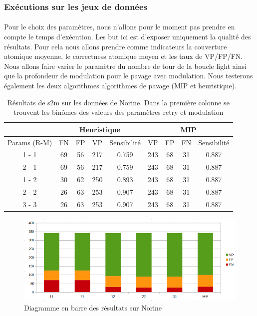 \documentclass[12pt,french,twoside]{report}
\begin{document}
\subsubsection{Exécutions sur les jeux de données}

\label{resultats_s2m_p}

\paragraph{}Pour le choix des paramètres, nous n'allons pour le moment pas prendre en compte le temps d'exécution.
Les but ici est d'exposer uniquement la qualité des résultats.
Pour cela nous allons prendre comme indicateurs la couverture atomique moyenne, le correctness atomique moyen et les taux de VP/FP/FN.
Nous allons faire varier le paramètre du nombre de tour de la boucle light ainsi que la profondeur de modulation pour le pavage avec modulation.
Nous testerons également les deux algorithmes algorithmes de pavage (MIP et heuristique).

\begin{table}[!h]
  \centering
  \begin{tabular}{|c|c|c|c|c|c|c|c|c|}
    \hline
    & \multicolumn{4}{c|}{Heuristique} & \multicolumn{4}{c|}{MIP} \\
    \hline
    Params (R-M) & FN & FP & VP & Sensibilité & VP & FP & FN & Sensibilité \\
    \hline
    1 - 1 & 69 & 56 & 217 & 0.759 & 243 & 68 & 31 & 0.887 \\
    \hline
    2 - 1 & 69 & 56 & 217 & 0.759 & 243 & 68 & 31 & 0.887 \\
    \hline
    1 - 2 & 30 & 62 & 250 & 0.893 & 243 & 68 & 31 & 0.887 \\
    \hline
    2 - 2 & 26 & 63 & 253 & 0.907 & 243 & 68 & 31 & 0.887 \\
    \hline
    3 - 3 & 26 & 63 & 253 & 0.907 & 243 & 68 & 31 & 0.887 \\
    \hline
  \end{tabular}
  \caption{\label{nor_results}Résultats de s2m sur les données de Norine.
  Dans la première colonne se trouvent les binômes des valeurs des paramètres retry et modulation}
\end{table}

\begin{figure}[!h]
  \begin{center}
    \includegraphics[width=450px]{Figures/s2m/results/Norine.png}
    \caption{\label{nor_graph}Diagramme en barre des résultats sur Norine}
  \end{center}
\end{figure}
\end{document}
